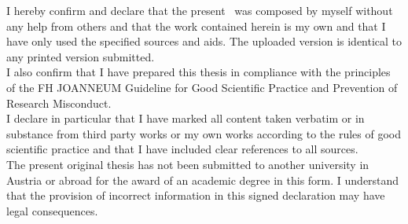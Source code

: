 %

\emptydoublepage \thispagestyle{empty} \vspace*{1cm}

	{\hfill\fontfamily{\sfdefault}\bfseries\fontsize{16}{16}\selectfont{Obligatory declaration}}\vspace*{1cm}

	\noindent I hereby confirm and declare that the present \DocTypeText ~was composed by myself without any help from others and that the work contained herein is my own and that I have only used the specified sources and aids. The uploaded version is identical to any printed version submitted.\\

	\noindent I also confirm that I have prepared this thesis in compliance with the principles of the \nohyphens{FH JOANNEUM} Guideline for Good Scientific Practice and Prevention of Research Misconduct.\\

	\noindent I declare in particular that I have marked all content taken verbatim or in substance from third party works or my own works according to the rules of good scientific practice and that I have included clear references to all sources.\\
	\noindent The present original thesis has not been submitted to another university in Austria or abroad for the award of an academic degree in this form.
	I understand that the provision of incorrect information in this signed declaration may have legal consequences.\p


\noindent

